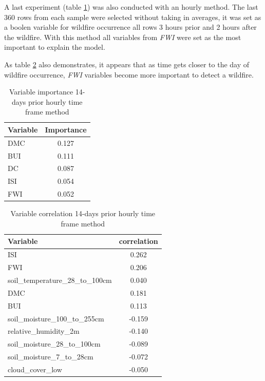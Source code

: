 A last experiment (table \ref{14_days_prior_hourly_importance}) was also conducted with an hourly method. The last 360 rows from each sample were selected without taking in averages, it was set as a boolen variable for wildfire occurrence all rows 3 hours prior and 2 hours after the wildfire. With this method all variables from \textit{FWI} were set as the most important to explain the model. 

As table \ref{14_days_prior_hourly_correlation} also demonstrates, it appears that as time gets closer to the day of wildfire occurrence, \textit{FWI} variables become more important to detect a wildfire.

\begin{table}[H]
	\centering
	\caption{Variable importance 14-days prior hourly time frame method}
	\begin{tabular}{lc}
		\hline
		Variable                         & \multicolumn{1}{l}{Importance} \\ \hline
		DMC & 0.127                          \\
		BUI                 & 0.111                          \\
		DC            & 0.087                          \\
		ISI           & 0.054                          \\
		FWI   & 0.052                         
	\end{tabular}
	\label{14_days_prior_hourly_importance}
\end{table}

\begin{table}[H]
	\caption{Variable correlation 14-days prior hourly time frame method}
	\centering
	\label{14_days_prior_hourly_correlation}
	\begin{tabular}{lc}
		\hline
		Variable                       & \multicolumn{1}{l}{correlation} \\ \hline
		ISI                             & 0.262                         \\
		FWI                            & 0.206                          \\
		soil\_temperature\_28\_to\_100cm & 0.040                          \\
		DMC                            & 0.181                          \\
		BUI             & 0.113   \\
		soil\_moisture\_100\_to\_255cm & -0.159 \\
		relative\_humidity\_2m & -0.140 \\
		soil\_moisture\_28\_to\_100cm & -0.089 \\
		soil\_moisture\_7\_to\_28cm & -0.072 \\
		cloud\_cover\_low & -0.050 \\                   
	\end{tabular}
\end{table}


